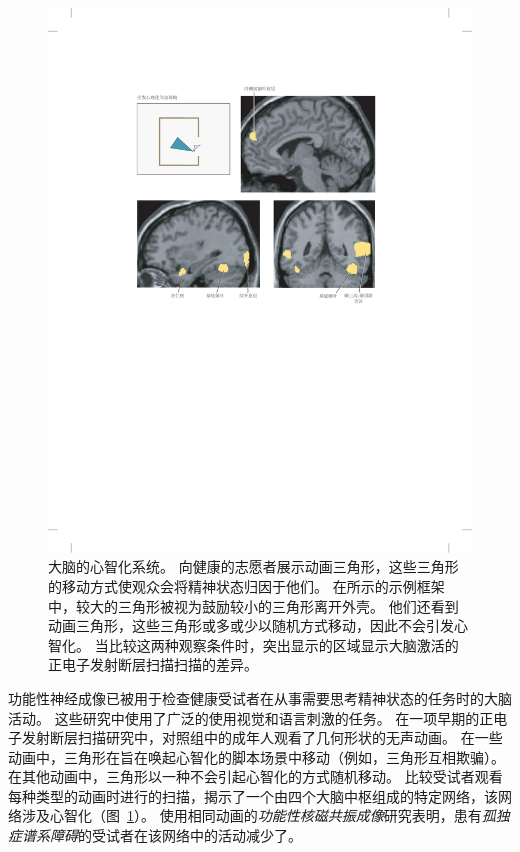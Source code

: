 \begin{figure}[htbp]
	\centering
	\includegraphics[width=0.9\linewidth]{chap62/fig_62_4}
	\caption{大脑的心智化系统。
		向健康的志愿者展示动画三角形，这些三角形的移动方式使观众会将精神状态归因于他们。
		在所示的示例框架中，较大的三角形被视为鼓励较小的三角形离开外壳。
		他们还看到动画三角形，这些三角形或多或少以随机方式移动，因此不会引发心智化。
		当比较这两种观察条件时，突出显示的区域显示大脑激活的正电子发射断层扫描扫描的差异\cite{castelli2002autism}。}
	\label{fig:62_4}
\end{figure}


功能性神经成像已被用于检查健康受试者在从事需要思考精神状态的任务时的大脑活动。
这些研究中使用了广泛的使用视觉和语言刺激的任务。
在一项早期的正电子发射断层扫描研究中，对照组中的成年人观看了几何形状的无声动画。
在一些动画中，三角形在旨在唤起心智化的脚本场景中移动（例如，三角形互相欺骗）。
在其他动画中，三角形以一种不会引起心智化的方式随机移动。
比较受试者观看每种类型的动画时进行的扫描，揭示了一个由四个大脑中枢组成的特定网络，该网络涉及心智化（图~\ref{fig:62_4}）。
使用相同动画的\textit{功能性核磁共振成像}研究表明，患有\textit{孤独症谱系障碍}的受试者在该网络中的活动减少了。


